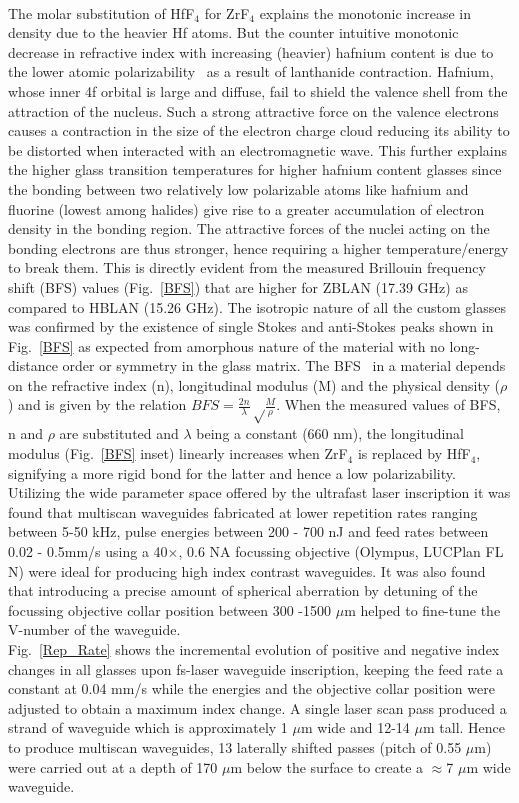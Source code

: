 \documentclass[11pt]{article}
\begin{document}
\\The molar substitution of HfF$_4$ for ZrF$_4$ explains the monotonic increase in density due to the heavier Hf atoms. But the counter intuitive monotonic decrease in refractive index with increasing (heavier) hafnium content is due to the lower atomic polarizability~\cite{Ghosh02} as a result of lanthanide contraction. Hafnium, whose inner 4f orbital is large and diffuse, fail to shield the valence shell from the attraction of the nucleus. Such a strong attractive force on the valence electrons causes a contraction in the size of the electron charge cloud reducing its ability to be distorted when interacted with an electromagnetic wave.  This further explains the higher glass transition temperatures for higher hafnium content glasses since the bonding between two relatively low polarizable atoms like hafnium and fluorine (lowest among halides) give rise to a greater accumulation of electron density in the bonding region. The attractive forces of the nuclei acting on the bonding electrons are thus stronger, hence requiring a higher temperature/energy to break them. This is directly evident from the measured Brillouin frequency shift (BFS) values (Fig.~\ref{BFS}) that are higher for ZBLAN (17.39 GHz) as compared to HBLAN (15.26 GHz). The isotropic nature of all the custom glasses was confirmed by the existence of single Stokes and anti-Stokes peaks shown in Fig.~\ref{BFS} as expected from amorphous nature of the material with no long-distance order or symmetry in the glass matrix. The BFS~\cite{Palombo19} in a material depends on the refractive index (n), longitudinal modulus (M) and the physical density ($\rho$) and is given by the relation  $BFS=\frac{2n}{\lambda} \sqrt \frac{M}{\rho}$. When the measured values of BFS, n and $\rho$ are substituted and $\lambda$ being a constant (660 nm), the longitudinal modulus (Fig.~\ref{BFS} inset) linearly increases when ZrF$_4$ is replaced by HfF$_4$, signifying a more rigid bond for the latter and hence a low polarizability.
\\Utilizing the wide parameter space offered by the ultrafast laser inscription it was found that multiscan waveguides fabricated at lower repetition rates ranging between 5-50 kHz, pulse energies between 200 - 700 nJ and feed rates between 0.02 - 0.5mm/s using a 40$\times$, 0.6 NA focussing objective (Olympus, LUCPlan FL N)  were ideal for producing high index contrast waveguides. It was also found that introducing a precise amount of spherical aberration by detuning of the focussing objective collar position between 300 -1500 $\mu$m helped to fine-tune the V-number of the waveguide. 
\\Fig.~\ref{Rep_Rate} shows the incremental evolution of positive and negative index changes in all glasses upon fs-laser waveguide inscription, keeping the feed rate a constant at 0.04 mm/s while the energies and the objective collar position were adjusted to obtain a maximum index change. A single laser scan pass produced a strand of waveguide which is approximately 1 $\mu$m wide and 12-14  $\mu$m tall. Hence to produce multiscan waveguides, 13 laterally shifted passes (pitch of 0.55 $\mu$m) were carried out at a depth of 170 $\mu$m below the surface to create a $\approx$7 $\mu$m wide waveguide.
\end{document}
